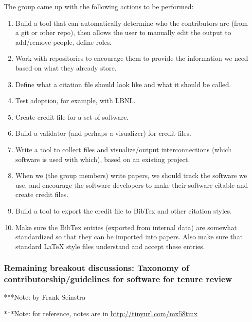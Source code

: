 \documentclass[11pt, oneside]{amsart}
\newcommand{\note}[1]{ {\textcolor{blueish}    { ***Note:      #1 }}}
\begin{document}
The group came up with the following actions to be performed:
\begin{enumerate}
\item Build a tool that can automatically determine who the contributors are 
(from a git or other repo), then allows the user to manually edit the output to 
add/remove people, define roles. 
\item Work with repositories to encourage them to provide the information we 
need based on what they already store.
\item Define what a citation file should look like and what it should be called.
\item Test adoption, for example, with LBNL.
\item Create credit file for a set of software.
\item Build a validator (and perhaps a visualizer) for credit files.
\item Write a tool to collect files and visualize/output interconnections (which 
software is used with which), based on an existing project.
\item When we (the group members) write papers, we should track the software 
we use, and encourage the software developers to make their software citable 
and create credit files.
\item Build a tool to export the credit file to BibTex and other citation styles.
\item Make sure the BibTex entries (exported from internal data) are somewhat 
standardized so that they can be imported into papers.  Also make sure that 
standard LaTeX style files understand and accept these entries.
\end{enumerate}


\subsubsection{Remaining breakout discussions: Taxonomy of contributorship/guidelines for software for tenure review}
\note{by Frank Seinstra}

\note{for reference, notes are in \url{http://tinyurl.com/mx58tmx}}
\end{document}
